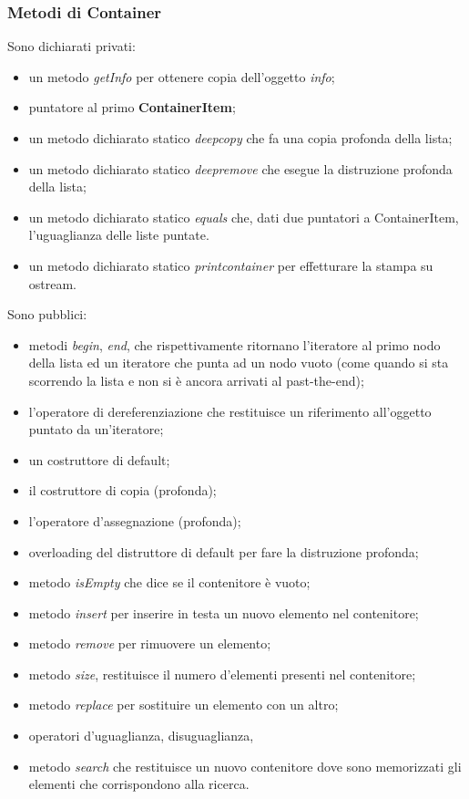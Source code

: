 {{			\subsubsection*{Metodi di Container}{
		Sono dichiarati privati:
			\begin{itemize}\itemsep=0.3pt
				\item un metodo \textit{getInfo} per ottenere copia dell'oggetto \textit{info};
				\item puntatore al primo \textbf{ContainerItem};
				\item un metodo dichiarato statico \textit{deepcopy} che fa una copia profonda della lista;
				\item un metodo dichiarato statico \textit{deepremove} che esegue la distruzione profonda della lista;
				\item un metodo dichiarato statico \textit{equals} che, dati due puntatori a ContainerItem, l'uguaglianza delle liste puntate.
				\item un metodo dichiarato statico \textit{printcontainer} per effetturare la stampa su ostream.
			\end{itemize}
			Sono pubblici:
			\begin{itemize}\itemsep=0.3pt
				\item metodi \textit{begin}, \textit{end}, che rispettivamente ritornano l'iteratore al primo nodo della lista ed un iteratore che punta ad un nodo vuoto (come quando si sta scorrendo la lista e non si è ancora arrivati al past-the-end);
				\item l'operatore di dereferenziazione che restituisce un riferimento all'oggetto puntato da un'iteratore;
				\item un costruttore di default;
				\item il costruttore di copia (profonda);
				\item l'operatore d'assegnazione (profonda);
				\item overloading del distruttore di default per fare la distruzione profonda;
				\item metodo \textit{isEmpty} che dice se il contenitore è vuoto;
				\item metodo \textit{insert} per inserire in testa un nuovo elemento nel contenitore;
				\item metodo \textit{remove} per rimuovere un elemento;
				\item metodo \textit{size}, restituisce il numero d'elementi presenti nel contenitore;
				\item metodo \textit{replace} per sostituire un elemento con un altro;
				\item operatori d'uguaglianza, disuguaglianza,
				\item metodo \textit{search} che restituisce un nuovo contenitore dove sono memorizzati gli elementi che corrispondono alla ricerca.
			\end{itemize}
			}
		}
}
